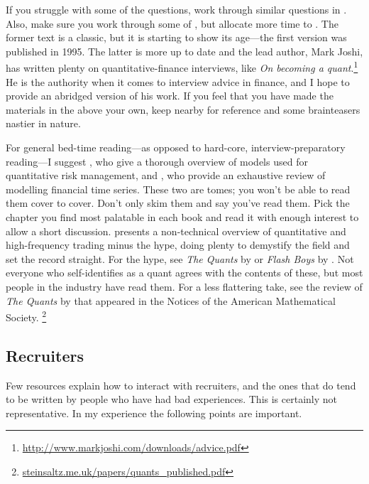 \documentclass[a4paper]{article}
\begin{document}
If you struggle with some of the questions, work through similar questions in \citep{JoshiQA}.
Also, make sure you work through some of \citet{HeardOnTheStreet}, but allocate more time to \citet{JoshiQA}.
The former text is a classic, but it is starting to show its age---the first version was published in 1995.
The latter is more up to date and the lead author, Mark Joshi, has written plenty on quantitative-finance interviews, like
\emph{On becoming a quant}.\footnote{\url{http://www.markjoshi.com/downloads/advice.pdf}}
He is the authority when it comes to interview advice in finance, and I hope to provide an abridged version of his work.
If you feel that you have made the materials in the above your own, keep \citet{WilmottFAQ} nearby for reference and some brainteasers nastier in nature.

For general bed-time reading---as opposed to hard-core, interview-preparatory reading---I suggest
\citet{mcneil2015quantitative}, who give a thorough overview of models used for quantitative risk management, and
\citet{andersen2009handbook}, who provide an exhaustive review of modelling financial time series.
These two are tomes; you won't be able to read them cover to cover.
Don't only skim them and say you've read them.
Pick the chapter you find most palatable in each book and read it with enough interest to allow a short discussion.
\citet{narang2013inside} presents a non-technical overview of quantitative and high-frequency trading minus the hype, doing plenty to demystify the field and set the record straight.
For the hype, see
\emph{The Quants} by \citet{patterson2010quants}
or
\emph{Flash Boys} by \citet{lewis2014flash}.
Not everyone who self-identifies as a quant agrees with the contents of these, but most people in the industry have read them.
For a less flattering take, see the review of \emph{The Quants} by \citet{steinsaltz2011value} that appeared in the Notices of the American Mathematical Society.%
\footnote{\url{steinsaltz.me.uk/papers/quants_published.pdf}}

{}
\subsection*{Recruiters}
Few resources explain how to interact with recruiters, and the ones that do tend to be written by people who have had bad experiences.
This is certainly not representative.
In my experience the following points are important.
\end{document}
